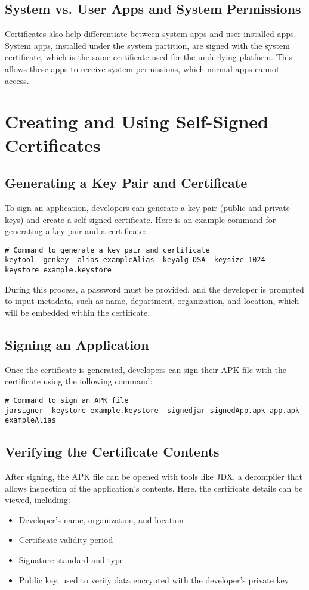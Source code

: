 \documentclass{article}
\begin{document}
\subsection{System vs. User Apps and System Permissions}
Certificates also help differentiate between system apps and user-installed apps. System apps, installed under the system partition, are signed with the system certificate, which is the same certificate used for the underlying platform. This allows these apps to receive system permissions, which normal apps cannot access.

\section{Creating and Using Self-Signed Certificates}
\subsection{Generating a Key Pair and Certificate}
To sign an application, developers can generate a key pair (public and private keys) and create a self-signed certificate. Here is an example command for generating a key pair and a certificate:
\begin{verbatim}
# Command to generate a key pair and certificate
keytool -genkey -alias exampleAlias -keyalg DSA -keysize 1024 -keystore example.keystore
\end{verbatim}
During this process, a password must be provided, and the developer is prompted to input metadata, such as name, department, organization, and location, which will be embedded within the certificate.

\subsection{Signing an Application}
Once the certificate is generated, developers can sign their APK file with the certificate using the following command:
\begin{verbatim}
# Command to sign an APK file
jarsigner -keystore example.keystore -signedjar signedApp.apk app.apk exampleAlias
\end{verbatim}

\subsection{Verifying the Certificate Contents}
After signing, the APK file can be opened with tools like JDX, a decompiler that allows inspection of the application's contents. Here, the certificate details can be viewed, including:
\begin{itemize}
    \item Developer’s name, organization, and location
    \item Certificate validity period
    \item Signature standard and type
    \item Public key, used to verify data encrypted with the developer’s private key
\end{itemize}
\end{document}
